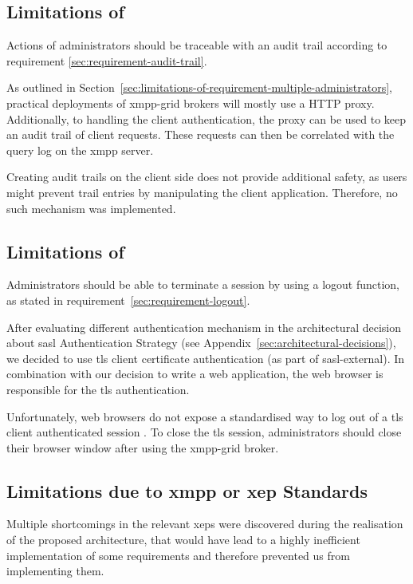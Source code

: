 \subsection{Limitations of \emph{}}

Actions of administrators should be traceable with an audit trail according to requirement \ref{sec:requirement-audit-trail}.

As outlined in Section~\ref{sec:limitations-of-requirement-multiple-administrators}, practical deployments of \gls{xmpp-grid} \glspl{broker} will mostly use a HTTP proxy.
Additionally, to handling the client authentication, the proxy can be used to keep an audit trail of client requests.
These requests can then be correlated with the query log on the \gls{xmpp} server.

Creating audit trails on the client side does not provide additional safety, as users might prevent trail entries by manipulating the client application.
Therefore, no such mechanism was implemented.

\subsection{Limitations of \emph{}}

Administrators should be able to terminate a session by using a logout function, as stated in requirement~\ref{sec:requirement-logout}.

After evaluating different authentication mechanism in the architectural decision about \gls{sasl} Authentication Strategy (see Appendix~\ref{sec:architectural-decisions}), we decided to use \gls{tls} client certificate authentication (as part of \gls{sasl-external}). In combination with our decision to write a web application, the web browser is responsible for the \gls{tls} authentication.

Unfortunately, web browsers do not expose a standardised way to log out of a \gls{tls} client authenticated session \cite{practical-issues-with-tls-client}.
To close the \gls{tls} session, administrators should close their browser window after using the \gls{xmpp-grid} \gls{broker}.

\subsection{Limitations due to \gls{xmpp} or \gls{xep} Standards}

Multiple shortcomings in the relevant \glspl{xep} were discovered during the realisation of the proposed architecture, that would have lead to a highly inefficient implementation of some requirements and therefore prevented us from implementing them.

